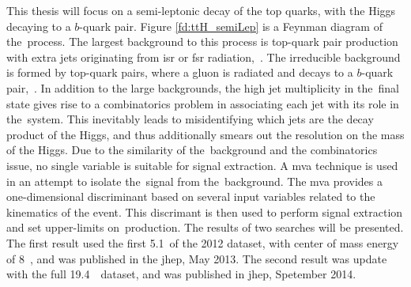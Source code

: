 \par This thesis will focus on a semi-leptonic decay of the top quarks, with the Higgs decaying to a $b$-quark pair.  Figure \ref{fd:ttH_semiLep} is a Feynman diagram of the~\ttH process.  The largest background to this process is top-quark pair production with extra jets originating from \acrfull{isr} or \acrfull{fsr} radiation,~\ttjets.  The irreducible background is formed by top-quark pairs, where a gluon is radiated and decays to a $b$-quark pair,~\ttbb.  In addition to the large backgrounds, the high jet multiplicity in the~\ttH final state gives rise to a combinatorics problem in associating each jet with its role in the~\ttH system.  This inevitably leads to misidentifying which jets are the decay product of the Higgs, and thus additionally smears out the resolution on the mass of the Higgs.  Due to the similarity of the~\ttbb background and the combinatorics issue, no single variable is suitable for signal extraction.  A \acrfull{mva} technique is used in an attempt to isolate the~\ttH signal from the~\ttjets background.  The \acrshort{mva} provides a one-dimensional discriminant based on several input variables related to the kinematics of the event.  This discrimant is then used to perform signal extraction and set upper-limits on~\ttH production.  The results of two searches will be presented.  The first result used the first 5.1~\fbinv of the 2012 dataset, with center of mass energy of 8~\TeV, and was published in the \acrfull{jhep}, May 2013.  The second result was update with the full 19.4~~\TeV dataset, and was published in \acrshort{jhep}, Spetember 2014.   
